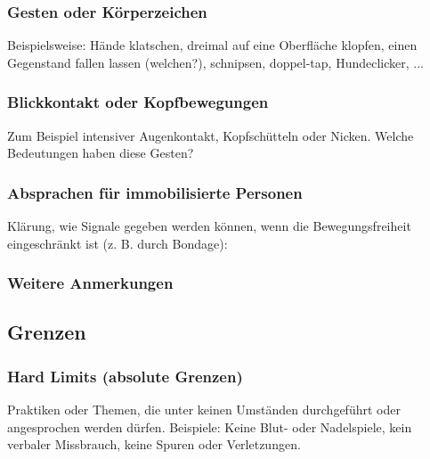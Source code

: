 \documentclass[a4paper,12pt]{article}
\begin{document}
\subsubsection{Gesten oder Körperzeichen}
\noindent Beispielsweise: Hände klatschen, dreimal auf eine Oberfläche klopfen, einen Gegenstand fallen lassen (welchen?), schnipsen, doppel-tap, Hundeclicker, ... \newline
\noindent \TextField[name=SafewordNonVerbal,multiline=true,height=8em, width=37em]{}

\subsubsection{Blickkontakt oder Kopfbewegungen}
\noindent Zum Beispiel intensiver Augenkontakt, Kopfschütteln oder Nicken. Welche Bedeutungen haben diese Gesten?\newline
\noindent \TextField[name=SafewordNonVerbalBlick,multiline=true,height=8em, width=37em]{}

\subsubsection{Absprachen für immobilisierte Personen}
\noindent Klärung, wie Signale gegeben werden können, wenn die Bewegungsfreiheit eingeschränkt ist (z. B. durch Bondage):\newline
\noindent \TextField[name=SafewordNonMobile,multiline=true,height=10em, width=37em]{}

\subsubsection{Weitere Anmerkungen}
\noindent \TextField[name=SafewordAnmerkungenNonVerbal,multiline=true,height=5em, width=37em]{}

\newpage
\subsection{Grenzen}
\subsubsection{Hard Limits (absolute Grenzen)}
\noindent Praktiken oder Themen, die unter keinen Umständen durchgeführt oder angesprochen werden dürfen. Beispiele: Keine Blut- oder Nadelspiele, kein verbaler Missbrauch, keine Spuren oder Verletzungen. \newline
\noindent \TextField[name=LimitsHard,multiline=true,height=15em, width=37em]{}
\end{document}

